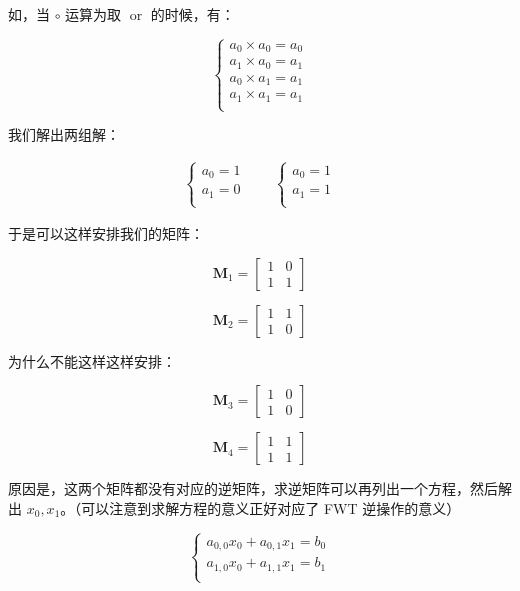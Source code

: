 \documentclass[12pt]{article} %
\begin{document}
如，当 $\circ$ 运算为取 $\operatorname{or}$ 的时候，有：

$$
\begin{cases}
    a_{0} \times a_{0}=a_{0} \\
    a_{1} \times a_{0}=a_{1} \\
    a_{0} \times a_{1}=a_{1} \\
    a_{1} \times a_{1}=a_{1} \\
\end{cases}
$$

我们解出两组解：

$$
\begin{aligned}
    \begin{cases}
        a_{0} =1 \\
        a_{1} =0 \\
    \end{cases}
    \qquad
    \begin{cases}
        a_{0} =1 \\
        a_{1} =1 \\
    \end{cases}
\end{aligned}
$$

于是可以这样安排我们的矩阵：

$$\mathbf{M}_1=\begin{bmatrix} 1 & 0 \\ 1 & 1 \end{bmatrix}$$

$$\mathbf{M}_2=\begin{bmatrix} 1 & 1 \\ 1 & 0 \end{bmatrix}$$

为什么不能这样这样安排：

$$\mathbf{M}_3=\begin{bmatrix} 1 & 0 \\ 1 & 0 \end{bmatrix}$$

$$\mathbf{M}_4=\begin{bmatrix} 1 & 1 \\ 1 & 1 \end{bmatrix}$$

原因是，这两个矩阵都没有对应的逆矩阵，求逆矩阵可以再列出一个方程，然后解出 $x_0,x_1$。（可以注意到求解方程的意义正好对应了 FWT 逆操作的意义）

$$
\begin{cases}
    a_{0,0}x_0 + a_{0,1}x_1 =b_0 \\
    a_{1,0}x_0 + a_{1,1}x_1 =b_1 \\
\end{cases}
$$
\end{document}
